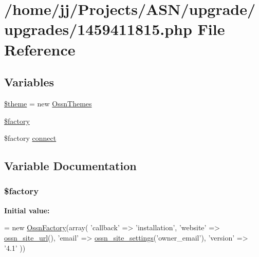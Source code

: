 \hypertarget{1459411815_8php}{}\section{/home/jj/\+Projects/\+A\+S\+N/upgrade/upgrades/1459411815.php File Reference}
\label{1459411815_8php}
\subsection*{Variables}
\begin{DoxyCompactItemize}
\item 
\hyperlink{1459411815_8php_a1ae541f7fe1c5e21cb4535f88ec9e9dc}{\$theme} = new \hyperlink{class_ossn_themes}{Ossn\+Themes}
\item 
\hyperlink{1459411815_8php_a099b374dc664ee043fffcd6ea05e3e70}{\$factory}
\item 
\$factory \hyperlink{1459411815_8php_a3fdbedd7713e458f25fcf7dc1f562a3d}{connect}
\end{DoxyCompactItemize}


\subsection{Variable Documentation}
\subsubsection[{\texorpdfstring{\$factory}{$factory}}]{\setlength{\rightskip}{0pt plus 5cm}\$factory}\hypertarget{1459411815_8php_a099b374dc664ee043fffcd6ea05e3e70}{}\label{1459411815_8php_a099b374dc664ee043fffcd6ea05e3e70}
{\bfseries Initial value\+:}
\begin{DoxyCode}
= \textcolor{keyword}{new} \hyperlink{class_ossn_factory}{OssnFactory}(array(
        \textcolor{stringliteral}{'callback'} => \textcolor{stringliteral}{'installation'},
        \textcolor{stringliteral}{'website'} => \hyperlink{ossn_8lib_8system_8php_a2f12f9244f99eccd1225afb76ef2ab65}{ossn\_site\_url}(),
        \textcolor{stringliteral}{'email'} => \hyperlink{ossn_8lib_8system_8php_a610e2045b8a86c09f777b4d82e24e34c}{ossn\_site\_settings}(\textcolor{stringliteral}{'owner\_email'}),
        \textcolor{stringliteral}{'version'} => \textcolor{stringliteral}{'4.1'}
))
\end{DoxyCode}


